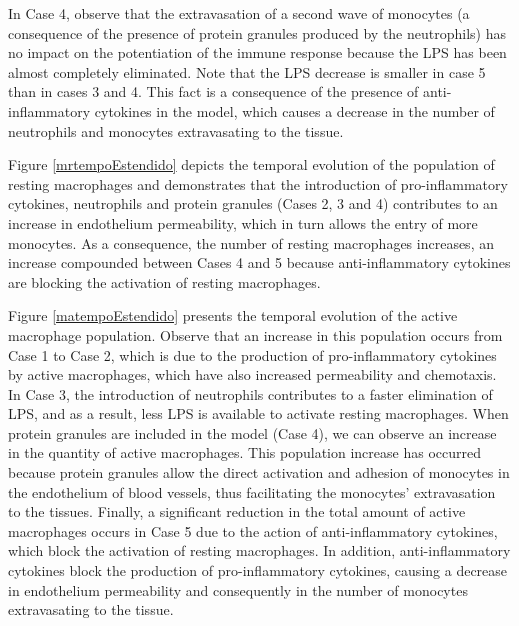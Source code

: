 \documentclass[10pt]{bmc_article}
\newenvironment{bmcformat}{\baselineskip20pt\sloppy\setboolean{publ}{false}}{\baselineskip20pt\sloppy}
\begin{document}
\begin{bmcformat}
In Case 4, observe that the extravasation of a second wave of monocytes (a consequence of the presence of protein granules produced by 
the neutrophils) has no impact on the potentiation of the immune response because the LPS has been almost completely eliminated. 
Note that the LPS decrease is smaller in case 5 than in cases 3 and 4. This fact is a consequence of the presence of anti-inflammatory 
cytokines in the model, which causes a decrease in the number of neutrophils and monocytes extravasating to the tissue. 


Figure \ref{mrtempoEstendido} depicts the temporal evolution of the population of resting macrophages and demonstrates 
that the introduction of pro-inflammatory cytokines, neutrophils and protein granules (Cases 2, 3 and 4) contributes to an increase in 
endothelium permeability, which in turn allows the entry of more monocytes. As a consequence, the number of resting macrophages increases, 
an increase compounded between Cases 4 and 5 because anti-inflammatory cytokines are blocking the activation of resting macrophages. 



Figure \ref{matempoEstendido} presents the temporal evolution of the active macrophage population. Observe that an increase in this 
population occurs from Case 1 to Case 2, which is due to the production of pro-inflammatory cytokines by active macrophages, which 
have also increased permeability and chemotaxis. In Case 3, the introduction of neutrophils contributes to a faster elimination of
LPS, and as a result, less LPS is available to activate resting macrophages. When protein granules are included in the model (Case 4), 
we can observe an increase in the quantity of active macrophages. This population increase has occurred because protein granules allow 
the direct activation and adhesion of monocytes in the endothelium of blood vessels, thus facilitating the monocytes' extravasation to 
the tissues. Finally, a significant reduction in the total amount of active macrophages occurs in Case 5 due to the action of 
anti-inflammatory cytokines, which  block the activation of resting macrophages. In addition, anti-inflammatory cytokines block the 
production of pro-inflammatory cytokines, causing a decrease in endothelium permeability and consequently in the number of monocytes 
extravasating to the tissue.


\end{bmcformat}
\end{document}
